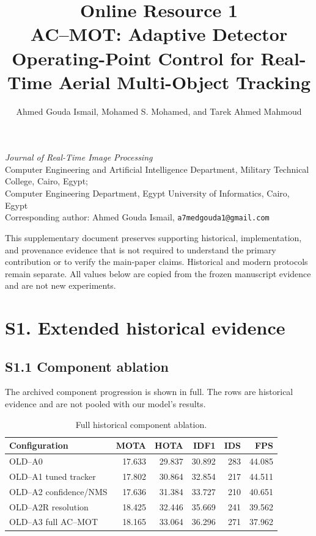\documentclass[11pt]{article}
\title{Online Resource 1\\[2pt]
AC--MOT: Adaptive Detector Operating-Point Control for Real-Time Aerial Multi-Object Tracking}
\author{Ahmed Gouda Ismail, Mohamed S. Mohamed, and Tarek Ahmed Mahmoud}
\date{}
\begin{document}
\maketitle

\begin{center}
\textit{Journal of Real-Time Image Processing}\\
Computer Engineering and Artificial Intelligence Department, Military Technical College, Cairo, Egypt;\\
Computer Engineering Department, Egypt University of Informatics, Cairo, Egypt\\
Corresponding author: Ahmed Gouda Ismail, \texttt{a7medgouda1@gmail.com}
\end{center}

This supplementary document preserves supporting historical, implementation, and
provenance evidence that is not required to understand the primary contribution
or to verify the main-paper claims. Historical and modern protocols remain
separate. All values below are copied from the frozen manuscript evidence and
are not new experiments.

\section*{S1. Extended historical evidence}

\subsection*{S1.1 Component ablation}
The archived component progression is shown in full. The rows are historical
evidence and are not pooled with our model's results.

\begin{table}[ht]
\centering\small
\caption{Full historical component ablation.}
\label{tab:s1-ablation}
\begin{tabular}{lrrrrr}
\toprule
Configuration & MOTA & HOTA & IDF1 & IDS & FPS\\
\midrule
OLD--A0 & 17.633 & 29.837 & 30.892 & 283 & 44.085\\
OLD--A1 tuned tracker & 17.802 & 30.864 & 32.854 & 217 & 44.511\\
OLD--A2 confidence/NMS & 17.636 & 31.384 & 33.727 & 210 & 40.651\\
OLD--A2R resolution & 18.425 & 32.446 & 35.669 & 241 & 39.562\\
OLD--A3 full AC--MOT & 18.165 & 33.064 & 36.296 & 271 & 37.962\\
\bottomrule
\end{tabular}
\end{table}
\end{document}
